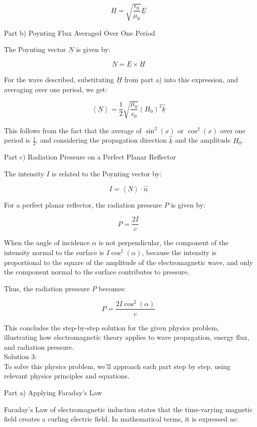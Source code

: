 \documentclass[a4paper,11pt]{article}
\begin{document}
\[
\underline{H} = \sqrt{\frac{\epsilon_{0}}{\mu_{0}}} \underline{E}
\]

Part b) Poynting Flux Averaged Over One Period

The Poynting vector \(\underline{N}\) is given by:

\[
\underline{N} = \underline{E} \times \underline{H}
\]

For the wave described, substituting \(\underline{H}\) from part a) into this expression, and averaging over one period, we get:

\[
\left< \underline{N} \right> = \frac{1}{2} \sqrt{\frac{\mu_{0}}{\epsilon_{0}}} (H_{0})^{2} \hat{\underline{k}}
\]

This follows from the fact that the average of \(\sin^2(x)\) or \(\cos^2(x)\) over one period is \(\frac{1}{2}\), and considering the propagation direction \(\hat{\underline{k}}\) and the amplitude \(H_{0}\).

Part c) Radiation Pressure on a Perfect Planar Reflector

The intensity \(I\) is related to the Poynting vector by:

\[
I = \left< \underline{N} \right> \cdot \hat{\underline{n}}
\]

For a perfect planar reflector, the radiation pressure \(P\) is given by:

\[
P = \frac{2I}{c}
\]

When the angle of incidence \(\alpha\) is not perpendicular, the component of the intensity normal to the surface is \(I \cos^2(\alpha)\), because the intensity is proportional to the square of the amplitude of the electromagnetic wave, and only the component normal to the surface contributes to pressure.

Thus, the radiation pressure \(P\) becomes:

\[
P = \frac{2I\cos^2(\alpha)}{c}
\]

This concludes the step-by-step solution for the given physics problem, illustrating how electromagnetic theory applies to wave propagation, energy flux, and radiation pressure. \\

\noindent Solution 3: \\

To solve this physics problem, we'll approach each part step by step, using relevant physics principles and equations.

Part a) Applying Faraday's Law

Faraday's Law of electromagnetic induction states that the time-varying magnetic field creates a curling electric field. In mathematical terms, it is expressed as:
\end{document}
